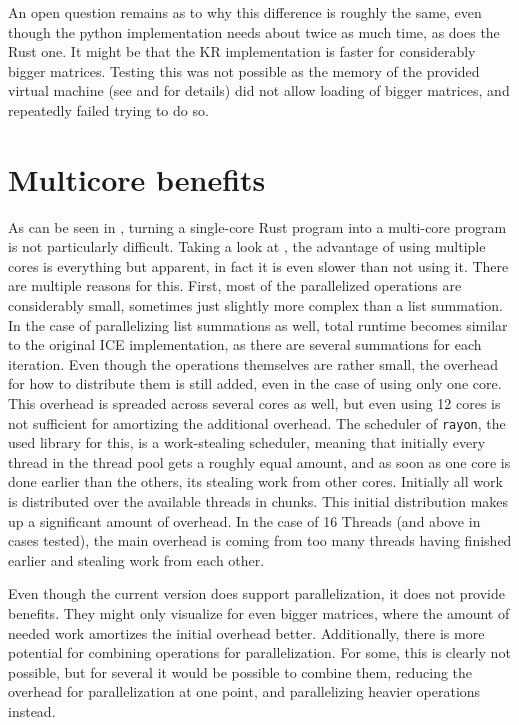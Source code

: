 An open question remains as to why this difference is roughly the same, even
though the python implementation needs about twice as much time, as does the
Rust one. It might be that the KR implementation is faster for considerably
bigger matrices. Testing this was not possible as the memory of the provided
virtual machine (see  and  for details)
did not allow loading of bigger matrices, and repeatedly failed trying to do
so.



\section{Multicore benefits}\label{sec:multicore}



As can be seen in , turning a single-core Rust program into
a multi-core program is not particularly difficult. Taking a look at
, the advantage of using multiple cores is everything
but apparent, in fact it is even slower than not using it. There are multiple
reasons for this. First, most of the parallelized operations are considerably
small, sometimes just slightly more complex than a list summation. In the case
of parallelizing list summations as well, total runtime becomes similar to the
original ICE implementation, as there are several summations for each
iteration. Even though the operations themselves are rather small, the overhead
for how to distribute them is still added, even in the case of using only one
core. This overhead is spreaded across several cores as well, but even using 12
cores is not sufficient for amortizing the additional overhead. The scheduler
of \verb|rayon|, the used library for this, is a work-stealing scheduler,
meaning that initially every thread in the thread pool gets a roughly equal
amount, and as soon as one core is done earlier than the others, its stealing
work from other cores. Initially all work is distributed over the available
threads in chunks. This initial distribution makes up a significant amount of
overhead. In the case of 16 Threads (and above in cases tested), the main
overhead is coming from too many threads having finished earlier and stealing
work from each other.

Even though the current version does support parallelization, it does not
provide benefits. They might only visualize for even bigger matrices, where the
amount of needed work amortizes the initial overhead better. Additionally,
there is more potential for combining operations for parallelization. For some,
this is clearly not possible, but for several it would be possible to combine
them, reducing the overhead for parallelization at one point, and parallelizing
heavier operations instead.

